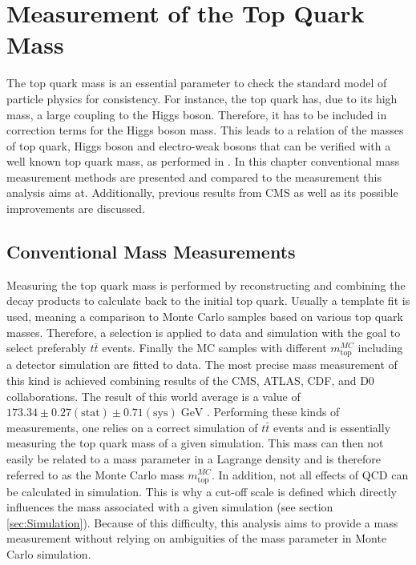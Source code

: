 \chapter{Measurement of the Top Quark Mass}
\label{ch:Measure}
	The top quark mass is an essential parameter to check the standard model of particle physics for consistency. For instance, the top quark has, due to its high mass, a large coupling to the Higgs boson. Therefore, it has to be included in correction terms for the Higgs boson mass. This leads to a relation of the masses of top quark, Higgs boson and electro-weak bosons that can be verified with a well known top quark mass, as performed in \cite{ewfit}. In this chapter conventional mass measurement methods are presented and compared to the measurement this analysis aims at. Additionally, previous results from CMS as well as its possible improvements are discussed. 
	
\section{Conventional Mass Measurements}
	Measuring the top quark mass is performed by reconstructing and combining the decay products to calculate back to the initial top quark. Usually a template  fit is used, meaning a comparison to Monte Carlo samples based on various top quark masses. Therefore, a selection is applied to data and simulation with the goal to select preferably $t\bar{t}$ events. Finally the MC samples with different $m_\text{top}^{MC}$ including a detector simulation are fitted to data. The most precise mass measurement of this kind is achieved combining results of the CMS, ATLAS, CDF, and D0 collaborations. The result of this world average is a value of $173.34 \pm 0.27 (\text{stat}) \pm 0.71 (\text{sys})\;\text{GeV}$ \cite{topmass_combination}. Performing these kinds of measurements, one relies on a correct simulation of $t\bar{t}$ events and is essentially measuring the top quark mass of a given simulation. This mass can then not easily be related to a mass parameter in a Lagrange density and is therefore referred to as the Monte Carlo mass $m_\text{top}^{MC}$. In addition, not all effects of QCD can be calculated \cite{nonperturbative} in simulation. This is why a cut-off \cite{cutoff} scale is defined which directly influences the mass associated with a given simulation (see section \ref{sec:Simulation}). Because of this difficulty, this analysis aims to provide a mass measurement without relying on ambiguities of the mass parameter in Monte Carlo simulation.

